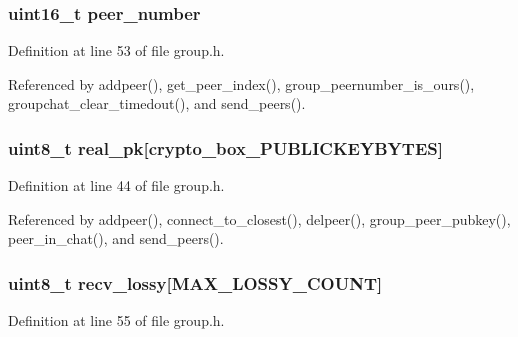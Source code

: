 \hypertarget{struct_group___peer_a264348ec1f724e05464ca97b7c432817}{
\subsubsection[{peer\+\_\+number}]{\setlength{\rightskip}{0pt plus 5cm}uint16\+\_\+t peer\+\_\+number}}\label{struct_group___peer_a264348ec1f724e05464ca97b7c432817}


Definition at line 53 of file group.\+h.



Referenced by addpeer(), get\+\_\+peer\+\_\+index(), group\+\_\+peernumber\+\_\+is\+\_\+ours(), groupchat\+\_\+clear\+\_\+timedout(), and send\+\_\+peers().

\hypertarget{struct_group___peer_ab42b4c90d81ac99b968c3edd1e21d706}{
\subsubsection[{real\+\_\+pk}]{\setlength{\rightskip}{0pt plus 5cm}uint8\+\_\+t real\+\_\+pk\mbox{[}crypto\+\_\+box\+\_\+\+P\+U\+B\+L\+I\+C\+K\+E\+Y\+B\+Y\+T\+E\+S\mbox{]}}}\label{struct_group___peer_ab42b4c90d81ac99b968c3edd1e21d706}


Definition at line 44 of file group.\+h.



Referenced by addpeer(), connect\+\_\+to\+\_\+closest(), delpeer(), group\+\_\+peer\+\_\+pubkey(), peer\+\_\+in\+\_\+chat(), and send\+\_\+peers().

\hypertarget{struct_group___peer_acf8dd69bcbe4de0b5a2b78803925994d}{
\subsubsection[{recv\+\_\+lossy}]{\setlength{\rightskip}{0pt plus 5cm}uint8\+\_\+t recv\+\_\+lossy\mbox{[}{\bf M\+A\+X\+\_\+\+L\+O\+S\+S\+Y\+\_\+\+C\+O\+U\+N\+T}\mbox{]}}}\label{struct_group___peer_acf8dd69bcbe4de0b5a2b78803925994d}


Definition at line 55 of file group.\+h.



